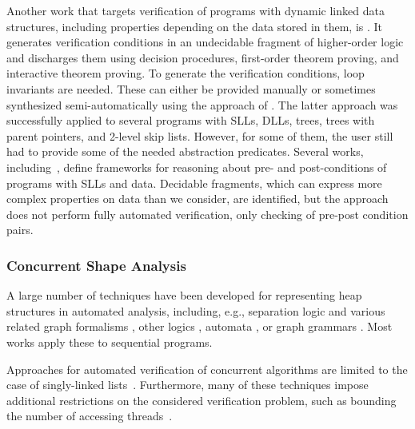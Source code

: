 Another work that targets verification of programs with dynamic linked data
structures, including properties depending on the data stored in them, is
\cite{Zee:pldi08}. It generates verification conditions in an undecidable
fragment of higher-order logic and discharges them using decision procedures,
first-order theorem proving, and interactive theorem proving. To generate the
verification conditions, loop invariants are needed. These can either be
provided manually or sometimes synthesized semi-automatically using the approach
of \cite{wies07hav}. The latter approach was successfully applied to several
programs with SLLs, DLLs, trees, trees with parent pointers, and 2-level skip
lists. However, for some of them, the user still had to provide some of the
needed abstraction predicates.
Several works, including~\cite{dragoi:atva12}, define frameworks for reasoning
about pre- and post-conditions of programs with SLLs and data. Decidable
fragments, which can express more complex properties on data than we consider,
are identified, but the approach does not perform fully automated verification,
only checking of pre-post condition pairs.
\subsubsection{Concurrent Shape Analysis}
A large number of techniques have been developed for representing heap structures
in automated analysis, including,
e.g., separation logic and various related graph formalisms
\cite{InvaderCAV08,rival11,dudka13}, other logics \cite{SRW:threevalued},
automata \cite{boxes13}, or graph grammars \cite{juggrnaut10}. 
Most works apply these to sequential programs.

Approaches for automated verification of concurrent algorithms are limited to the
case of singly-linked
lists~\cite{AHHR:integrated:short,meyer:vmcai16,Quy:sas16,Sagiv:correlation,Vafeiadis:cav10}.
Furthermore, many of these techniques impose additional restrictions on the considered verification problem, such as bounding the number of accessing
threads~\cite{Amit:comparisonAbstraction,Vechev:spin09,CernyRZCA:CAV10}.

